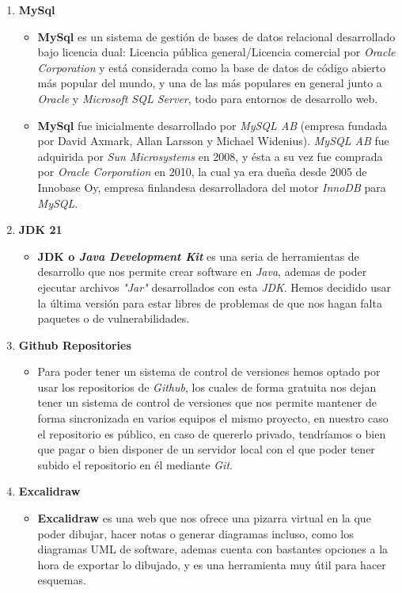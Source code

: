 \documentclass[a4paper]{article}
\begin{document}
\begin{enumerate}
\begin{itemize}
          \end{itemize}
    \item \textbf{MySql}
          \begin{itemize}
              \item \textbf{MySql} es un sistema de gestión de bases de datos relacional desarrollado bajo licencia dual: Licencia pública general/Licencia comercial por \textit{Oracle Corporation} y está considerada como la base de datos de código abierto más popular del mundo, y una de las más populares en general junto a \textit{Oracle} y \textit{Microsoft SQL Server}, todo para entornos de desarrollo web.
              \item \textbf{MySql} fue inicialmente desarrollado por \textit{MySQL AB} (empresa fundada por David Axmark, Allan Larsson y Michael Widenius). \textit{MySQL AB} fue adquirida por \textit{Sun Microsystems} en 2008, y ésta a su vez fue comprada por \textit{Oracle Corporation} en 2010, la cual ya era dueña desde 2005 de Innobase Oy, empresa finlandesa desarrolladora del motor \textit{InnoDB} para \textit{MySQL}.
          \end{itemize}
    \item \textbf{JDK 21}
          \begin{itemize}
              \item \textbf{JDK o \textit{Java Development Kit}} es una seria de herramientas de desarrollo que nos permite crear software en \textit{Java}, ademas de poder ejecutar archivos \textit{"Jar"} desarrollados con esta \textit{JDK}. Hemos decidido usar la última versión para estar libres de problemas de que nos hagan falta paquetes o de vulnerabilidades.
          \end{itemize}
    \item \textbf{Github Repositories}
          \begin{itemize}
              \item Para poder tener un sistema de control de versiones hemos optado por usar los repositorios de \textit{Github}, los cuales de forma gratuita nos dejan tener un sistema de control de versiones que nos permite mantener de forma sincronizada en varios equipos el mismo proyecto, en nuestro caso el repositorio es público, en caso de quererlo privado, tendríamos o bien que pagar o bien disponer de un servidor local con el que poder tener subido el repositorio en él mediante \textit{Git}.
          \end{itemize}
    \item \textbf{Excalidraw}
          \begin{itemize}
              \item \textbf{Excalidraw} es una web que nos ofrece una pizarra virtual en la que poder dibujar, hacer notas o generar diagramas incluso, como los diagramas UML de software, ademas cuenta con bastantes opciones a la hora de exportar lo dibujado, y es una herramienta muy útil para hacer esquemas.
          \end{itemize}
\end{enumerate}
\clearpage
\end{document}

